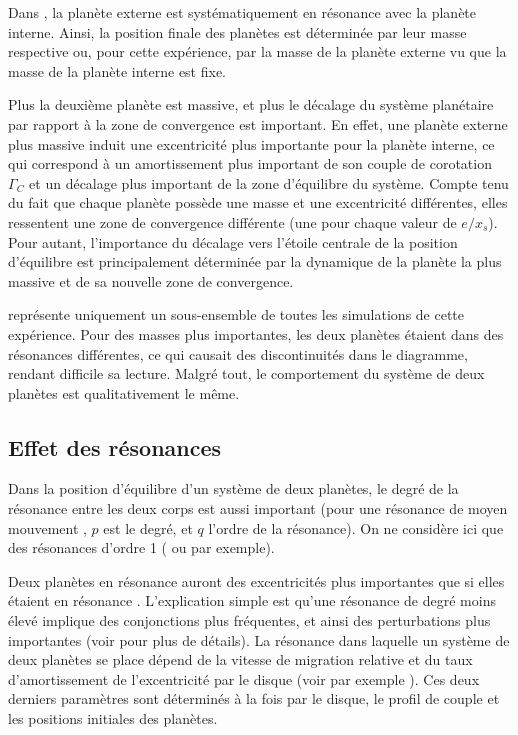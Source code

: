 \bigskip

Dans , la planète externe est systématiquement en résonance  avec la planète interne. Ainsi, la position finale des planètes est déterminée par leur masse respective ou, pour cette expérience, par la masse de la planète externe vu que la masse de la planète interne est fixe. 

Plus la deuxième planète est massive, et plus le décalage du système planétaire par rapport à la zone de convergence est important. En effet, une planète externe plus massive induit une excentricité plus importante pour la planète interne, ce qui correspond à un amortissement plus important de son couple de corotation $\Gamma_C$ et un décalage plus important de la zone d'équilibre du système. Compte tenu du fait que chaque planète possède une masse et une excentricité différentes, elles ressentent une zone de convergence différente (une pour chaque valeur de $e/x_s$). Pour autant, l'importance du décalage vers l'étoile centrale de la position d'équilibre est principalement déterminée par la dynamique de la planète la plus massive et de sa nouvelle zone de convergence.

\bigskip

 représente uniquement un sous-ensemble de toutes les simulations de cette expérience. Pour des masses plus importantes, les deux planètes étaient dans des résonances différentes, ce qui causait des discontinuités dans le diagramme, rendant difficile sa lecture. Malgré tout, le comportement du système de deux planètes est qualitativement le même.

\subsection{Effet des résonances}
Dans la position d'équilibre d'un système de deux planètes, le degré de la résonance entre les deux corps est aussi important (pour une résonance de moyen mouvement , $p$ est le degré, et $q$ l'ordre de la résonance). On ne considère ici que des résonances d'ordre 1 ( ou  par exemple).

Deux planètes en résonance  auront des excentricités plus importantes que si elles étaient en résonance . L'explication simple est qu'une résonance de degré moins élevé implique des conjonctions plus fréquentes, et ainsi des perturbations plus importantes (voir \cite{murray2000solar} pour plus de détails). La résonance dans laquelle un système de deux planètes se place dépend de la vitesse de migration relative et du taux d'amortissement de l'excentricité par le disque (voir par exemple \cite{mustill2011general}). Ces deux derniers paramètres sont déterminés à la fois par le disque, le profil de couple et les positions initiales des planètes. 

